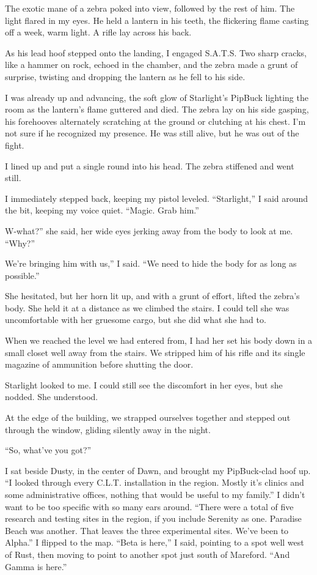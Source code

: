 The exotic mane of a zebra poked into view, followed by the rest of him. The light flared in my eyes. He held a lantern in his teeth, the flickering flame casting off a week, warm light. A rifle lay across his back.

As his lead hoof stepped onto the landing, I engaged S.A.T.S. Two sharp cracks, like a hammer on rock, echoed in the chamber, and the zebra made a grunt of surprise, twisting and dropping the lantern as he fell to his side.

I was already up and advancing, the soft glow of Starlight’s PipBuck lighting the room as the lantern’s flame guttered and died. The zebra lay on his side gasping, his forehooves alternately scratching at the ground or clutching at his chest. I’m not sure if he recognized my presence. He was still alive, but he was out of the fight.

I lined up and put a single round into his head. The zebra stiffened and went still.

I immediately stepped back, keeping my pistol leveled. “Starlight,” I said around the bit, keeping my voice quiet. “Magic. Grab him.”

\leavevmode{}W-what?” she said, her wide eyes jerking away from the body to look at me. “Why?”

\leavevmode{}We’re bringing him with us,” I said. “We need to hide the body for as long as possible.”

She hesitated, but her horn lit up, and with a grunt of effort, lifted the zebra’s body. She held it at a distance as we climbed the stairs. I could tell she was uncomfortable with her gruesome cargo, but she did what she had to.

When we reached the level we had entered from, I had her set his body down in a small closet well away from the stairs. We stripped him of his rifle and its single magazine of ammunition before shutting the door.

Starlight looked to me. I could still see the discomfort in her eyes, but she nodded. She understood.

At the edge of the building, we strapped ourselves together and stepped out through the window, gliding silently away in the night.

{\br}%
“So, what’ve you got?”

I sat beside Dusty, in the center of Dawn, and brought my PipBuck-clad hoof up. “I looked through every C.L.T. installation in the region. Mostly it’s clinics and some administrative offices, nothing that would be useful to my family.” I didn’t want to be too specific with so many ears around. “There were a total of five research and testing sites in the region, if you include Serenity as one. Paradise Beach was another. That leaves the three experimental sites. We’ve been to Alpha.” I flipped to the map. “Beta is here,” I said, pointing to a spot well west of Rust, then moving to point to another spot just south of Mareford. “And Gamma is here.”

